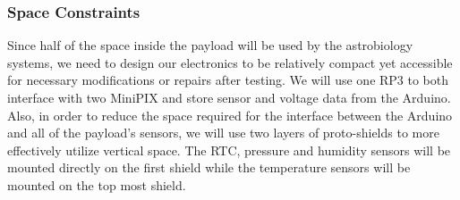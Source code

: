 \subsubsection{Space Constraints}
Since half of the space inside the payload will be used by the astrobiology systems, we need to design our electronics to be relatively compact yet accessible for necessary modifications or repairs after testing. We will use one RP3 to both interface with two MiniPIX and store sensor and voltage data from the Arduino.  Also, in order to reduce the space required for the interface between the Arduino and all of the payload's sensors, we will use two layers of proto-shields to more effectively utilize vertical space. The RTC, pressure and humidity sensors will be mounted directly on the first shield while the temperature sensors will be mounted on the top most shield. 

